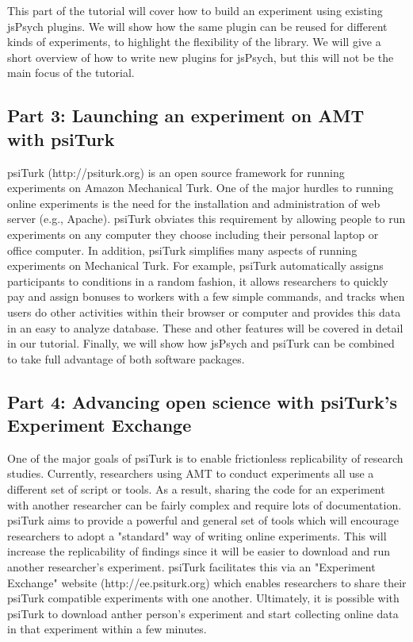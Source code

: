 \documentclass[10pt,letterpaper]{article}
\begin{document}
This part of the tutorial will cover how to build an experiment using existing jsPsych plugins. We will show how the same plugin can be reused for different kinds of experiments, to highlight the flexibility of the library. We will give a short overview of how to write new plugins for jsPsych, but this will not be the main focus of the tutorial.

\subsection{Part 3: Launching an experiment on AMT with psiTurk}

psiTurk (http://psiturk.org) is an open source framework for running experiments on Amazon Mechanical Turk.  One of the major hurdles to running online experiments
is the need for the installation and administration of web server (e.g., Apache).  psiTurk obviates this requirement by allowing people to run experiments
on any computer they choose including their personal laptop or office computer.  In addition, psiTurk simplifies many aspects of running experiments
on Mechanical Turk.  For example, psiTurk automatically assigns participants to conditions in a random fashion, it allows researchers to quickly
pay and assign bonuses to workers with a few simple commands, and tracks when users do other activities within their browser or computer
and provides this data in an easy to analyze database.   These and other features will be covered in detail in our tutorial. Finally, we will show how jsPsych and psiTurk can be combined to take full advantage of both software packages.

\subsection{Part 4: Advancing open science with psiTurk's Experiment Exchange}

One of the major goals of psiTurk is to enable frictionless replicability of research studies.  Currently, researchers using AMT to conduct
experiments all use a different set of script or tools.  As a result, sharing the code for an experiment with another researcher can be fairly complex
and require lots of documentation.  psiTurk aims to provide a powerful and general set of tools which will encourage researchers to adopt
a "standard" way of writing online experiments.  This will increase the replicability of findings since it will be easier to download and run
another researcher's experiment.  psiTurk facilitates this via an "Experiment Exchange" website (http://ee.psiturk.org) which enables researchers 
to share their psiTurk compatible experiments with one another.  Ultimately, it is possible with psiTurk to download anther person's experiment 
and start collecting online data in that experiment within a few minutes.
\end{document}
